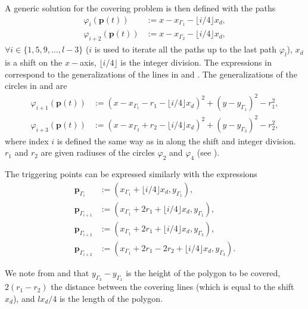 A generic solution for the covering problem is then defined with the paths
\begin{subequations}\label{eq:line-gene}\begin{align}
  \varphi_i(\mathbf{p}(t))&:=x-x_{\Gamma_1}-\lfloor i/4\rfloor x_d,\\
  \varphi_{i+2}(\mathbf{p}(t))&:=x-x_{\Gamma_2}-\lfloor i/4\rfloor x_d,
\end{align}
\end{subequations}
$\forall i\in\{1,5,9,\dots,l-3\}$ ($i$ is used to iterate all the paths up to the last path $\varphi_l$), $x_d$ is a shift on the $x-$axis, $\lfloor i/4\rfloor$ is the integer division. The expressions in  correspond to the generalizations of the lines in  and . The generalizations of the circles in  and  are
\begin{subequations}\begin{align}
  \varphi_{i+1}(\mathbf{p}(t))&:=(x-x_{\Gamma_1}-r_1-\lfloor i/4\rfloor x_d)^2+(y-y_{\Gamma_1})^2-r_1^2,\\
  \varphi_{i+3}(\mathbf{p}(t))&:=(x-x_{\Gamma_2}+r_2-\lfloor i/4\rfloor x_d)^2+(y-y_{\Gamma_3})^2-r_2^2,\label{eq:second-circ-gene}
\end{align}
\end{subequations}
where index $i$ is defined the same way as in  along the shift and integer division. $r_1$ and $r_2$ are given radiuses of the circles $\varphi_2$ and $\varphi_4$ (see ).

The triggering points can be expressed similarly with the expressions
\begin{subequations}\label{eq:trigs-gene}\begin{align}
  \mathbf{p}_{\Gamma_i}&:=(x_{\Gamma_1}+\lfloor i/4\rfloor x_d,y_{\Gamma_1}),\\
  \mathbf{p}_{\Gamma_{i+1}}&:=(x_{\Gamma_1}+2r_1+\lfloor i/4\rfloor x_d,y_{\Gamma_1}),\\
  \mathbf{p}_{\Gamma_{i+2}}&:=(x_{\Gamma_1}+2r_1+\lfloor i/4\rfloor x_d,y_{\Gamma_3}),\\
  \mathbf{p}_{\Gamma_{i+2}}&:=(x_{\Gamma_1}+2r_1-2r_2+\lfloor i/4\rfloor x_d,y_{\Gamma_3})\label{eq:last-trig-gene}.
\end{align}
\end{subequations}

We note from  and  that $y_{\Gamma_3}-y_{\Gamma_1}$ is the height of the polygon to be covered, $2(r_1-r_2)$ the distance between the covering lines (which is equal to the shift $x_d$), and $lx_d/4$ is the length of the polygon.

